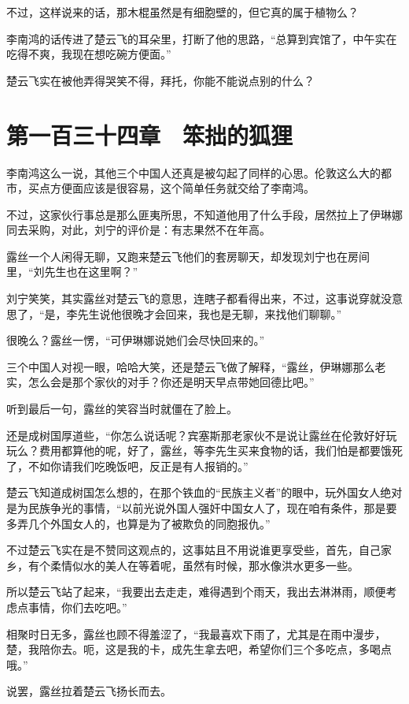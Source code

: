不过，这样说来的话，那木棍虽然是有细胞壁的，但它真的属于植物么？

李南鸿的话传进了楚云飞的耳朵里，打断了他的思路，“总算到宾馆了，中午实在吃得不爽，我现在想吃碗方便面。”

楚云飞实在被他弄得哭笑不得，拜托，你能不能说点别的什么？

\section{第一百三十四章　笨拙的狐狸}

李南鸿这么一说，其他三个中国人还真是被勾起了同样的心思。伦敦这么大的都市，买点方便面应该是很容易，这个简单任务就交给了李南鸿。

不过，这家伙行事总是那么匪夷所思，不知道他用了什么手段，居然拉上了伊琳娜同去采购，对此，刘宁的评价是：有志果然不在年高。

露丝一个人闲得无聊，又跑来楚云飞他们的套房聊天，却发现刘宁也在房间里，“刘先生也在这里啊？”

刘宁笑笑，其实露丝对楚云飞的意思，连瞎子都看得出来，不过，这事说穿就没意思了，“是，李先生说他很晚才会回来，我也是无聊，来找他们聊聊。”

很晚么？露丝一愣，“可伊琳娜说她们会尽快回来的。”

三个中国人对视一眼，哈哈大笑，还是楚云飞做了解释，“露丝，伊琳娜那么老实，怎么会是那个家伙的对手？你还是明天早点带她回德比吧。”

听到最后一句，露丝的笑容当时就僵在了脸上。

还是成树国厚道些，“你怎么说话呢？宾塞斯那老家伙不是说让露丝在伦敦好好玩玩么？费用都算他的呢，好了，露丝，等李先生买来食物的话，我们怕是都要饿死了，不如你请我们吃晚饭吧，反正是有人报销的。”

楚云飞知道成树国怎么想的，在那个铁血的“民族主义者”的眼中，玩外国女人绝对是为民族争光的事情，“以前光说外国人强奸中国女人了，现在咱有条件，那是要多弄几个外国女人的，也算是为了被欺负的同胞报仇。”

不过楚云飞实在是不赞同这观点的，这事姑且不用说谁更享受些，首先，自己家乡，有个柔情似水的美人在等着呢，虽然有时候，那水像洪水更多一些。

所以楚云飞站了起来，“我要出去走走，难得遇到个雨天，我出去淋淋雨，顺便考虑点事情，你们去吃吧。”

相聚时日无多，露丝也顾不得羞涩了，“我最喜欢下雨了，尤其是在雨中漫步，楚，我陪你去。呃，这是我的卡，成先生拿去吧，希望你们三个多吃点，多喝点哦。”

说罢，露丝拉着楚云飞扬长而去。

